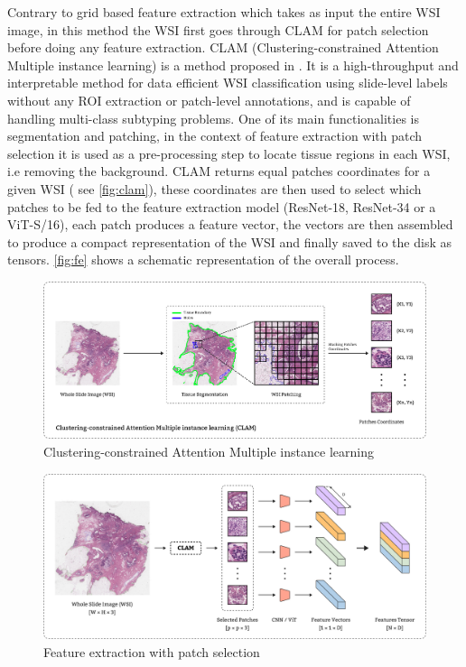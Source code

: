 \documentclass[
11pt, %
english, %
singlespacing, %
headsepline, %
]{project_structure}
\begin{document}
\noindent Contrary to grid based feature extraction which takes as input the entire \acrshort{WSI} image, in this method the \acrshort{WSI} first goes through \acrshort{CLAM} for patch selection before doing any feature extraction. \acrshort{CLAM} (Clustering-constrained Attention Multiple instance learning) is a method proposed in \cite{CLAM}. It is a high-throughput and interpretable method for data efficient \acrshort{WSI} classification using slide-level labels without any \acrshort{ROI} extraction or patch-level annotations, and is capable of handling multi-class subtyping problems. One of its main functionalities is segmentation and patching, in the context of feature extraction with patch selection it is used as a pre-processing step to locate tissue regions in each \acrshort{WSI}, i.e removing the background. \acrshort{CLAM} returns equal patches coordinates for a given \acrshort{WSI} ( see \autoref{fig:clam}), these coordinates are then used to select which patches to be fed to the feature extraction model (\acrshort{ResNet}-18, \acrshort{ResNet}-34 or a ViT-S/16), each patch produces a feature vector, the vectors are then assembled to produce a compact representation of the \acrshort{WSI} and finally saved to the disk as tensors. \autoref{fig:fe} shows a schematic representation of the overall process.

\begin{figure}[H]
    \centering
    \includegraphics[width=\textwidth]{figures/ACMIL_methods/clam.png}
    \caption{Clustering-constrained Attention Multiple instance learning}
    \label{fig:clam}
\end{figure}

\begin{figure}[H]
    \centering
    \includegraphics[width=\textwidth]{figures/ACMIL_methods/FE.png}
    \caption{Feature extraction with patch selection}
    \label{fig:fe}
\end{figure}
\end{document}
